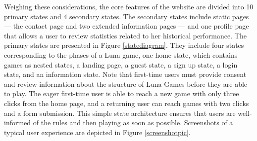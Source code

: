 Weighing these considerations, the core features of the website are divided into 10 primary states and 4 secondary states. The secondary states include static pages --- the contact page and two extended information pages --- and one profile page that allows a user to review statistics related to her historical performance. The primary states are presented in Figure \ref{statediagram}. They include four states corresponding to the phases of a Luna game, one home state, which contains games as nested states, a landing page, a guest state, a sign up state, a login state, and an information state. Note that first-time users must provide consent and review information about the structure of Luna Games before they are able to play. The eager first-time user is able to reach a new game with only three clicks from the home page, and a returning user can reach games with two clicks and a form submission. This simple state architecture ensures that users are well-informed of the rules and then playing as soon as possible. Screenshots of a typical user experience are depicted in Figure \ref{screenshotpic}.

